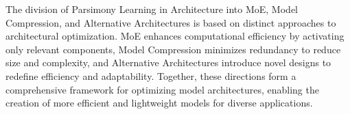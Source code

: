 The division of Parsimony Learning in Architecture into MoE, Model Compression, and Alternative Architectures is based on distinct approaches to architectural optimization. MoE enhances computational efficiency by activating only relevant components, Model Compression minimizes redundancy to reduce size and complexity, and Alternative Architectures introduce novel designs to redefine efficiency and adaptability. Together, these directions form a comprehensive framework for optimizing model architectures, enabling the creation of more efficient and lightweight models for diverse applications.